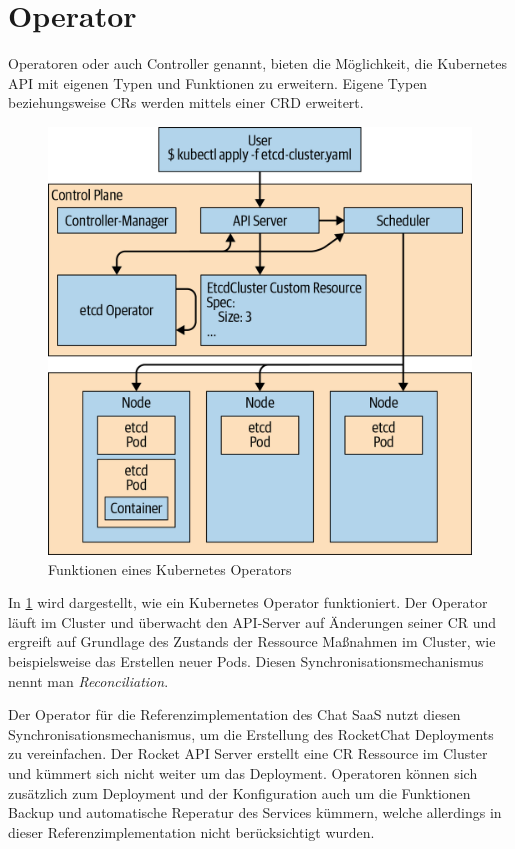 \section{Operator}
\label{sec:komponenten:operator}

Operatoren oder auch Controller genannt, bieten die Möglichkeit, die Kubernetes API mit eigenen Typen und Funktionen zu erweitern.
Eigene Typen beziehungsweise \acp{CR} werden mittels einer \ac{CRD} erweitert.
\begin{figure}[h]
  \centering
  \includegraphics{gfx/chapters/3_komponenten/operator_example.png}
  \caption{Funktionen eines Kubernetes Operators}
  \label{fig:kubernetes_operator_example}
\end{figure}

In \ref{fig:kubernetes_operator_example} wird dargestellt, wie ein Kubernetes Operator funktioniert. Der Operator läuft im Cluster und
überwacht den API-Server auf Änderungen seiner \ac{CR} und ergreift auf Grundlage des Zustands der Ressource Maßnahmen im Cluster, 
wie beispielsweise das Erstellen neuer Pods.\cite{Dobies2020}
Diesen Synchronisationsmechanismus nennt man \emph{Reconciliation}.

Der Operator für die Referenzimplementation des Chat \ac{SaaS} nutzt diesen Synchronisationsmechanismus, um die Erstellung des RocketChat
Deployments zu vereinfachen. Der Rocket API Server erstellt eine \ac{CR} Ressource im Cluster und kümmert sich nicht weiter um 
das Deployment. Operatoren können sich zusätzlich zum Deployment und der Konfiguration auch um die Funktionen Backup 
und automatische Reperatur des Services kümmern\cite{Dobies2020}, welche allerdings in dieser Referenzimplementation 
nicht berücksichtigt wurden.

